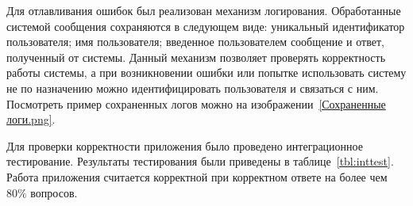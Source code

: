 
Для отлавливания ошибок был реализован механизм логирования. Обработанные
системой сообщения сохраняются в следующем виде: уникальный идентификатор 
пользователя; имя пользователя; введенное пользователем сообщение и ответ,
полученный от системы. Данный механизм позволяет проверять корректность работы
системы, а при возникновении ошибки или попытке использовать систему не по
назначению можно идентифицировать пользователя и связаться с ним. Посмотреть
пример сохраненных логов можно на изображении~\ref{Сохраненные логи.png}.



Для проверки корректности приложения было проведено интеграционное
тестирование. Результаты тестирования были приведены в таблице~\ref{tbl:inttest}.
Работа приложения считается корректной при корректном ответе на более чем
$80\%$ вопросов.

